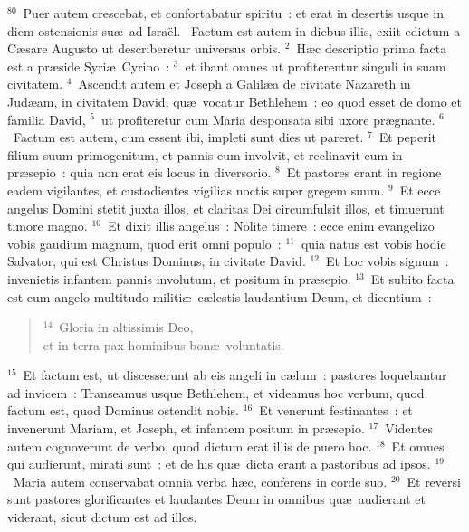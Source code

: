 ${}^{80}$~Puer autem crescebat, et confortabatur spiritu~: et erat in desertis usque in diem ostensionis su\ae\ ad Isra\"el.
~Factum est autem in diebus illis, exiit edictum a C\ae sare Augusto ut describeretur universus orbis.
${}^{2}$~H\ae c descriptio prima facta est a pr\ae side Syri\ae\ Cyrino~:
${}^{3}$~et ibant omnes ut profiterentur singuli in suam civitatem.
${}^{4}$~Ascendit autem et Joseph a Galil\ae a de civitate Nazareth in Jud\ae am, in civitatem David, qu\ae\ vocatur Bethlehem~: eo quod esset de domo et familia David,
${}^{5}$~ut profiteretur cum Maria desponsata sibi uxore pr\ae gnante.
${}^{6}$~Factum est autem, cum essent ibi, impleti sunt dies ut pareret.
${}^{7}$~Et peperit filium suum primogenitum, et pannis eum involvit, et reclinavit eum in pr\ae sepio~: quia non erat eis locus in diversorio.
${}^{8}$~Et pastores erant in regione eadem vigilantes, et custodientes vigilias noctis super gregem suum.
${}^{9}$~Et ecce angelus Domini stetit juxta illos, et claritas Dei circumfulsit illos, et timuerunt timore magno.
${}^{10}$~Et dixit illis angelus~: Nolite timere~: ecce enim evangelizo vobis gaudium magnum, quod erit omni populo~:
${}^{11}$~quia natus est vobis hodie Salvator, qui est Christus Dominus, in civitate David.
${}^{12}$~Et hoc vobis signum~: invenietis infantem pannis involutum, et positum in pr\ae sepio.
${}^{13}$~Et subito facta est cum angelo multitudo militi\ae\ c\ae lestis laudantium Deum, et dicentium~:
\begin{flushleft}\begin{verse}${}^{14}$~Gloria in altissimis Deo,\\ et in terra pax hominibus bon\ae\ voluntatis.\end{verse}\end{flushleft}


${}^{15}$~Et factum est, ut discesserunt ab eis angeli in c\ae lum~: pastores loquebantur ad invicem~: Transeamus usque Bethlehem, et videamus hoc verbum, quod factum est, quod Dominus ostendit nobis.
${}^{16}$~Et venerunt festinantes~: et invenerunt Mariam, et Joseph, et infantem positum in pr\ae sepio.
${}^{17}$~Videntes autem cognoverunt de verbo, quod dictum erat illis de puero hoc.
${}^{18}$~Et omnes qui audierunt, mirati sunt~: et de his qu\ae\ dicta erant a pastoribus ad ipsos.
${}^{19}$~Maria autem conservabat omnia verba h\ae c, conferens in corde suo.
${}^{20}$~Et reversi sunt pastores glorificantes et laudantes Deum in omnibus qu\ae\ audierant et viderant, sicut dictum est ad illos.


